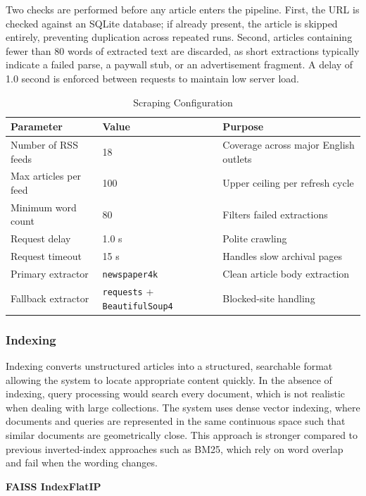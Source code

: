 Two checks are performed before any article enters the pipeline. First, the URL is checked against an SQLite database; if already present, the article is skipped entirely, preventing duplication across repeated runs. Second, articles containing fewer than 80 words of extracted text are discarded, as short extractions typically indicate a failed parse, a paywall stub, or an advertisement fragment. A delay of 1.0 second is enforced between requests to maintain low server load.

\begin{table}[H]
\caption{Scraping Configuration}
\label{tab:scraping_config}
\centering
\begin{tabularx}{\linewidth}{|l|l|X|}
\hline
\textbf{Parameter} & \textbf{Value} & \textbf{Purpose} \\
\hline
Number of RSS feeds & 18 & Coverage across major English outlets \\
Max articles per feed & 100 & Upper ceiling per refresh cycle \\
Minimum word count & 80 & Filters failed extractions \\
Request delay & 1.0 s & Polite crawling \\
Request timeout & 15 s & Handles slow archival pages \\
Primary extractor & \texttt{newspaper4k} & Clean article body extraction \\
Fallback extractor & \texttt{requests} + \texttt{BeautifulSoup4} & Blocked-site handling \\
\hline
\end{tabularx}
\end{table}

\subsubsection{Indexing}

Indexing converts unstructured articles into a structured, searchable format allowing the system to locate appropriate content quickly. In the absence of indexing, query processing would search every document, which is not realistic when dealing with large collections. The system uses dense vector indexing, where documents and queries are represented in the same continuous space such that similar documents are geometrically close. This approach is stronger compared to previous inverted-index approaches such as BM25, which rely on word overlap and fail when the wording changes.

\textbf{FAISS IndexFlatIP}

